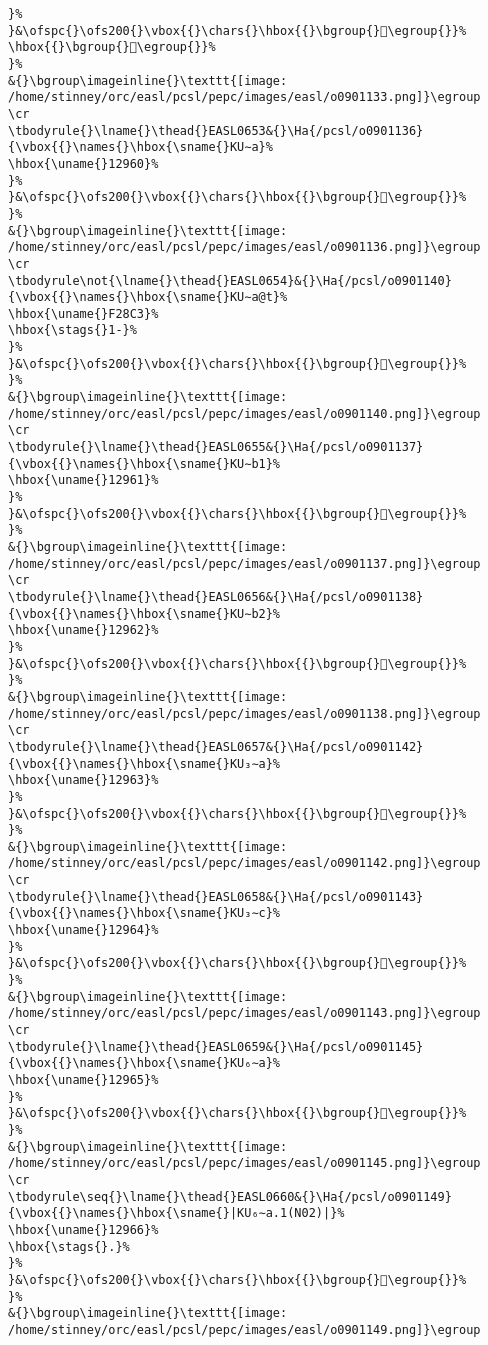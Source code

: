 \begin{verbatim}
}%
}&\ofspc{}\ofs200{}\vbox{{}\chars{}\hbox{{}\bgroup{}𒥞\egroup{}}%
\hbox{{}\bgroup{}𒥟\egroup{}}%
}%
&{}\bgroup\imageinline{}\texttt{[image: /home/stinney/orc/easl/pcsl/pepc/images/easl/o0901133.png]}\egroup
\cr
\tbodyrule{}\lname{}\thead{}EASL0653&{}\Ha{/pcsl/o0901136}{\vbox{{}\names{}\hbox{\sname{}KU∼a}%
\hbox{\uname{}12960}%
}%
}&\ofspc{}\ofs200{}\vbox{{}\chars{}\hbox{{}\bgroup{}𒥠\egroup{}}%
}%
&{}\bgroup\imageinline{}\texttt{[image: /home/stinney/orc/easl/pcsl/pepc/images/easl/o0901136.png]}\egroup
\cr
\tbodyrule\not{\lname{}\thead{}EASL0654}&{}\Ha{/pcsl/o0901140}{\vbox{{}\names{}\hbox{\sname{}KU∼a@t}%
\hbox{\uname{}F28C3}%
\hbox{\stags{}1-}%
}%
}&\ofspc{}\ofs200{}\vbox{{}\chars{}\hbox{{}\bgroup{}󲣃\egroup{}}%
}%
&{}\bgroup\imageinline{}\texttt{[image: /home/stinney/orc/easl/pcsl/pepc/images/easl/o0901140.png]}\egroup
\cr
\tbodyrule{}\lname{}\thead{}EASL0655&{}\Ha{/pcsl/o0901137}{\vbox{{}\names{}\hbox{\sname{}KU∼b1}%
\hbox{\uname{}12961}%
}%
}&\ofspc{}\ofs200{}\vbox{{}\chars{}\hbox{{}\bgroup{}𒥡\egroup{}}%
}%
&{}\bgroup\imageinline{}\texttt{[image: /home/stinney/orc/easl/pcsl/pepc/images/easl/o0901137.png]}\egroup
\cr
\tbodyrule{}\lname{}\thead{}EASL0656&{}\Ha{/pcsl/o0901138}{\vbox{{}\names{}\hbox{\sname{}KU∼b2}%
\hbox{\uname{}12962}%
}%
}&\ofspc{}\ofs200{}\vbox{{}\chars{}\hbox{{}\bgroup{}𒥢\egroup{}}%
}%
&{}\bgroup\imageinline{}\texttt{[image: /home/stinney/orc/easl/pcsl/pepc/images/easl/o0901138.png]}\egroup
\cr
\tbodyrule{}\lname{}\thead{}EASL0657&{}\Ha{/pcsl/o0901142}{\vbox{{}\names{}\hbox{\sname{}KU₃∼a}%
\hbox{\uname{}12963}%
}%
}&\ofspc{}\ofs200{}\vbox{{}\chars{}\hbox{{}\bgroup{}𒥣\egroup{}}%
}%
&{}\bgroup\imageinline{}\texttt{[image: /home/stinney/orc/easl/pcsl/pepc/images/easl/o0901142.png]}\egroup
\cr
\tbodyrule{}\lname{}\thead{}EASL0658&{}\Ha{/pcsl/o0901143}{\vbox{{}\names{}\hbox{\sname{}KU₃∼c}%
\hbox{\uname{}12964}%
}%
}&\ofspc{}\ofs200{}\vbox{{}\chars{}\hbox{{}\bgroup{}𒥤\egroup{}}%
}%
&{}\bgroup\imageinline{}\texttt{[image: /home/stinney/orc/easl/pcsl/pepc/images/easl/o0901143.png]}\egroup
\cr
\tbodyrule{}\lname{}\thead{}EASL0659&{}\Ha{/pcsl/o0901145}{\vbox{{}\names{}\hbox{\sname{}KU₆∼a}%
\hbox{\uname{}12965}%
}%
}&\ofspc{}\ofs200{}\vbox{{}\chars{}\hbox{{}\bgroup{}𒥥\egroup{}}%
}%
&{}\bgroup\imageinline{}\texttt{[image: /home/stinney/orc/easl/pcsl/pepc/images/easl/o0901145.png]}\egroup
\cr
\tbodyrule\seq{}\lname{}\thead{}EASL0660&{}\Ha{/pcsl/o0901149}{\vbox{{}\names{}\hbox{\sname{}|KU₆∼a.1(N02)|}%
\hbox{\uname{}12966}%
\hbox{\stags{}.}%
}%
}&\ofspc{}\ofs200{}\vbox{{}\chars{}\hbox{{}\bgroup{}𒥦\egroup{}}%
}%
&{}\bgroup\imageinline{}\texttt{[image: /home/stinney/orc/easl/pcsl/pepc/images/easl/o0901149.png]}\egroup

\end{verbatim}

